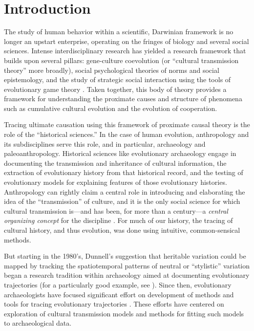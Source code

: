 \section{Introduction}
\label{sec:introduction}
The study of human behavior within a scientific, Darwinian framework is no longer an upstart enterprise, operating on the fringes of biology and several social sciences.  Intense interdisciplinary research has yielded a research framework that builds upon several pillars:  gene-culture coevolution (or ``cultural transmission theory'' more broadly), social psychological theories of  norms and social epistemology, and the study of strategic social interaction using the tools of evolutionary game theory \citep{gintis2014bounds}.  Taken together, this body of theory provides a framework for understanding the proximate causes and structure of phenomena such as cumulative cultural evolution and the evolution of cooperation.

Tracing ultimate causation using this framework of proximate causal theory is the role of the ``historical sciences.''  In the case of human evolution, anthropology and its subdisciplines serve this role, and in particular, archaeology and paleoanthropology.  Historical sciences like evolutionary archaeology engage in documenting the transmission and inheritance of cultural information, the extraction of evolutionary history from that historical record, and the testing of evolutionary models for explaining features of those evolutionary histories.  Anthropology can rightly claim a central role in introducing and elaborating the idea of the ``transmission'' of culture, and it is the only social science for which cultural transmission is---and has been, for more than a century---a \emph{central organizing concept} for the discipline \citep{lyman2008cultural}.  For much of our history, the tracing of cultural history, and thus evolution, was done using intuitive, common-sensical methods.   

But starting in the 1980's, Dunnell's suggestion that heritable variation could be mapped by tracking the spatiotemporal patterns of neutral or ``stylistic'' variation began a research tradition within archaeology aimed at documenting evolutionary trajectories (for a particularly good example, see \citealp{scholnick2010apprenticeship}).  Since then, evolutionary archaeologists have focused significant effort on development of methods and tools for tracing evolutionary trajectories \citep{Dunnell1978,Dunnell1980,Dunnell1992,lipo2006mapping,OBrian2000}.  These efforts have centered on exploration of cultural transmission models and methods for fitting such models to archaeological data.    


